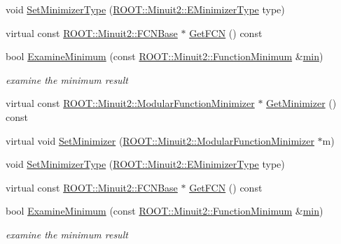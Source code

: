 \begin{DoxyCompactItemize}
\item 
void \mbox{\hyperlink{classROOT_1_1Minuit2_1_1Minuit2Minimizer_a9f1b93afd722023e5c879453e65f1041}{Set\+Minimizer\+Type}} (\mbox{\hyperlink{namespaceROOT_1_1Minuit2_abdfae3dff24b1dc5a23955c06fe2a8d6}{R\+O\+O\+T\+::\+Minuit2\+::\+E\+Minimizer\+Type}} type)
\item 
virtual const \mbox{\hyperlink{classROOT_1_1Minuit2_1_1FCNBase}{R\+O\+O\+T\+::\+Minuit2\+::\+F\+C\+N\+Base}} $\ast$ \mbox{\hyperlink{classROOT_1_1Minuit2_1_1Minuit2Minimizer_aee4d274acbb0db4702010a62ebdd4d56}{Get\+F\+CN}} () const
\item 
bool \mbox{\hyperlink{classROOT_1_1Minuit2_1_1Minuit2Minimizer_a004057cf512dcbd986799fabe756cecc}{Examine\+Minimum}} (const \mbox{\hyperlink{classROOT_1_1Minuit2_1_1FunctionMinimum}{R\+O\+O\+T\+::\+Minuit2\+::\+Function\+Minimum}} \&\mbox{\hyperlink{adat__devel_2lib_2SU3_2SU3__internal_8h_ab0f5fed3171eb00d1c5f037d9f518a23}{min}})
\begin{DoxyCompactList}\small\item\em examine the minimum result \end{DoxyCompactList}\item 
virtual const \mbox{\hyperlink{classROOT_1_1Minuit2_1_1ModularFunctionMinimizer}{R\+O\+O\+T\+::\+Minuit2\+::\+Modular\+Function\+Minimizer}} $\ast$ \mbox{\hyperlink{classROOT_1_1Minuit2_1_1Minuit2Minimizer_a43246cb7bf4e7553d8e2e9fe25722cb4}{Get\+Minimizer}} () const
\item 
virtual void \mbox{\hyperlink{classROOT_1_1Minuit2_1_1Minuit2Minimizer_acbb90c93015f5cf8e5ee99881a305019}{Set\+Minimizer}} (\mbox{\hyperlink{classROOT_1_1Minuit2_1_1ModularFunctionMinimizer}{R\+O\+O\+T\+::\+Minuit2\+::\+Modular\+Function\+Minimizer}} $\ast$m)
\item 
void \mbox{\hyperlink{classROOT_1_1Minuit2_1_1Minuit2Minimizer_a9f1b93afd722023e5c879453e65f1041}{Set\+Minimizer\+Type}} (\mbox{\hyperlink{namespaceROOT_1_1Minuit2_abdfae3dff24b1dc5a23955c06fe2a8d6}{R\+O\+O\+T\+::\+Minuit2\+::\+E\+Minimizer\+Type}} type)
\item 
virtual const \mbox{\hyperlink{classROOT_1_1Minuit2_1_1FCNBase}{R\+O\+O\+T\+::\+Minuit2\+::\+F\+C\+N\+Base}} $\ast$ \mbox{\hyperlink{classROOT_1_1Minuit2_1_1Minuit2Minimizer_aee4d274acbb0db4702010a62ebdd4d56}{Get\+F\+CN}} () const
\item 
bool \mbox{\hyperlink{classROOT_1_1Minuit2_1_1Minuit2Minimizer_a004057cf512dcbd986799fabe756cecc}{Examine\+Minimum}} (const \mbox{\hyperlink{classROOT_1_1Minuit2_1_1FunctionMinimum}{R\+O\+O\+T\+::\+Minuit2\+::\+Function\+Minimum}} \&\mbox{\hyperlink{adat__devel_2lib_2SU3_2SU3__internal_8h_ab0f5fed3171eb00d1c5f037d9f518a23}{min}})
\begin{DoxyCompactList}\small\item\em examine the minimum result \end{DoxyCompactList}\end{DoxyCompactItemize}
